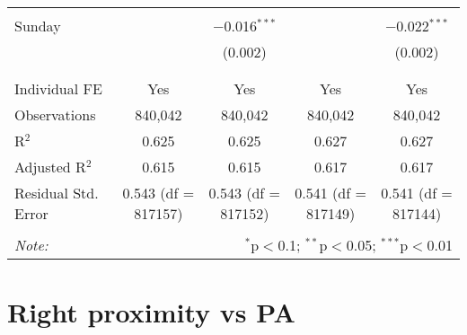 \documentclass[
]{article}
\begin{document}
\begin{table}[!htbp]
{\begin{tabular}{@{\extracolsep{5pt}}lcccc}
  & & & & \\ 
 Sunday &  & $-$0.016$^{***}$ &  & $-$0.022$^{***}$ \\ 
  &  & (0.002) &  & (0.002) \\ 
  & & & & \\ 
\hline \\[-1.8ex] 
Individual FE & Yes & Yes & Yes & Yes \\ 
Observations & 840,042 & 840,042 & 840,042 & 840,042 \\ 
R$^{2}$ & 0.625 & 0.625 & 0.627 & 0.627 \\ 
Adjusted R$^{2}$ & 0.615 & 0.615 & 0.617 & 0.617 \\ 
Residual Std. Error & 0.543 (df = 817157) & 0.543 (df = 817152) & 0.541 (df = 817149) & 0.541 (df = 817144) \\ 
\hline 
\hline \\[-1.8ex] 
\textit{Note:}  & \multicolumn{4}{r}{$^{*}$p$<$0.1; $^{**}$p$<$0.05; $^{***}$p$<$0.01} \\ 
\end{tabular}
} 
\end{table} 
\newpage
\section{Right proximity vs PA}
\end{document}
